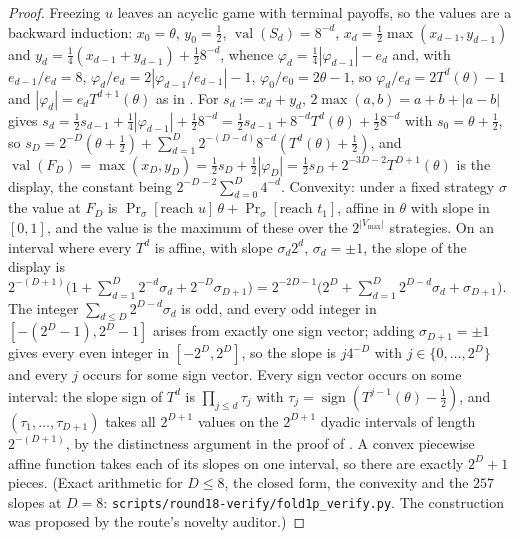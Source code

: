\documentclass[11pt]{article}
\theoremstyle{plain}
\theoremstyle{definition}
\DeclareMathOperator{\val}{val}
\newcommand{\Vmax}{V_{\max}}
\begin{document}
\begin{proof}
Freezing $u$ leaves an acyclic game with terminal payoffs, so the values are
a backward induction: $x_0=\theta$, $y_0=\tfrac12$, $\val(S_d)=8^{-d}$,
$x_d=\tfrac12\max(x_{d-1},y_{d-1})$ and
$y_d=\tfrac14(x_{d-1}+y_{d-1})+\tfrac12 8^{-d}$, whence
$\varphi_d=\tfrac14|\varphi_{d-1}|-e_d$ and, with $e_{d-1}/e_d=8$,
$\varphi_d/e_d=2|\varphi_{d-1}/e_{d-1}|-1$, $\varphi_0/e_0=2\theta-1$, so
$\varphi_d/e_d=2T^{d}(\theta)-1$ and $|\varphi_d|=e_dT^{d+1}(\theta)$ as in
. For $s_d:=x_d+y_d$, $2\max(a,b)=a+b+|a-b|$
gives $s_d=\tfrac12s_{d-1}+\tfrac14|\varphi_{d-1}|+\tfrac12 8^{-d}
=\tfrac12s_{d-1}+8^{-d}T^{d}(\theta)+\tfrac12 8^{-d}$ with $s_0=\theta+\tfrac12$,
so $s_D=2^{-D}(\theta+\tfrac12)+\sum_{d=1}^{D}2^{-(D-d)}8^{-d}(T^{d}(\theta)+\tfrac12)$,
and $\val(F_D)=\max(x_D,y_D)=\tfrac12s_D+\tfrac12|\varphi_D|
=\tfrac12s_D+2^{-3D-2}T^{D+1}(\theta)$ is the display, the constant being
$2^{-D-2}\sum_{d=0}^{D}4^{-d}$. Convexity: under a fixed strategy $\sigma$
the value at $F_D$ is $\Pr_\sigma[\text{reach }u]\,\theta+\Pr_\sigma[\text{reach }t_1]$,
affine in $\theta$ with slope in $[0,1]$, and the value is the maximum of
these over the $2^{|\Vmax|}$ strategies. On an interval where every $T^{d}$
is affine, with slope $\sigma_d2^{d}$, $\sigma_d=\pm1$, the slope of the
display is
$2^{-(D+1)}\bigl(1+\sum_{d=1}^{D}2^{-d}\sigma_d+2^{-D}\sigma_{D+1}\bigr)
=2^{-2D-1}\bigl(2^{D}+\sum_{d=1}^{D}2^{D-d}\sigma_d+\sigma_{D+1}\bigr)$.
The integer $\sum_{d\le D}2^{D-d}\sigma_d$ is odd, and every odd integer in
$[-(2^{D}-1),2^{D}-1]$ arises from exactly one sign vector; adding
$\sigma_{D+1}=\pm1$ gives every even integer in $[-2^{D},2^{D}]$, so the
slope is $j4^{-D}$ with $j\in\{0,\dots,2^{D}\}$ and every $j$ occurs for some
sign vector. Every sign vector occurs on some interval: the slope sign of
$T^{d}$ is $\prod_{j\le d}\tau_j$ with $\tau_j=\operatorname{sign}(T^{j-1}(\theta)-\tfrac12)$,
and $(\tau_1,\dots,\tau_{D+1})$ takes all $2^{D+1}$ values on the $2^{D+1}$
dyadic intervals of length $2^{-(D+1)}$, by the distinctness argument in
the proof of . A convex piecewise affine
function takes each of its slopes on one interval, so there are exactly
$2^{D}+1$ pieces. (Exact arithmetic for $D\le8$, the closed form, the
convexity and the $257$ slopes at $D=8$:
\texttt{scripts/round18-verify/fold1p\_verify.py}. The construction was
proposed by the route's novelty auditor.)
\end{proof}
\end{document}
